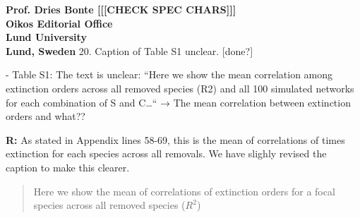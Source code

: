 \documentclass[12pt]{letter}
\begin{document}
\begin{letter}{\bf Prof. Dries Bonte [[[CHECK SPEC CHARS]]]\\
Oikos Editorial Office \\
Lund University \\
Lund, Sweden}
    20. Caption of Table S1 unclear. [done?]

      - Table S1: The text is unclear: “Here we show the mean correlation among
      extinction orders across all removed species (R2) and all 100 simulated networks for each combination of S and C…“ → The mean correlation between extinction orders and what??


      \textbf{R:} As stated in Appendix lines 58-69, this is the mean of correlations of times extinction for each species across all removals. We have slighly revised the caption to make this clearer.


      \begin{quotation}
        Here we show the mean of correlations of extinction orders for a focal species across all removed species ($R^2$)
      \end{quotation}


\end{letter}
\end{document}
